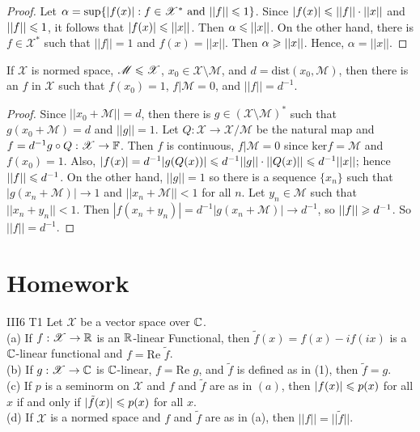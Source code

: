 \begin{proof}
    Let $\alpha = \sup \{|f(x)|:f\in\mathscr{X}^* \text{ and }||f||\leqslant 1\}$.
    Since $|f(x)|\leqslant ||f||\cdot ||x||$  and $||f||\leqslant 1$, it follows that $|f(x)|\leqslant ||x||$. Then $\alpha\leqslant ||x||$.
    On the other hand, there is $f\in \mathscr{X}^*$ such that $||f||=1$ and $f(x)=||x||$. Then $\alpha\geqslant ||x||$.
    Hence, $\alpha=||x||$.
\end{proof}

\begin{corollary}
    If $\mathscr{X}$ is normed space, $\mathscr{M}\leqslant \mathscr{X}$, $x_0\in \mathscr{X}\setminus \mathscr{M}$, and $d=\text{dist}(x_0,\mathscr{M})$,
    then there is an $f$ in $\mathscr{X}$ such that $f(x_0)=1$, $f|\mathscr{M}=0$, and $||f||=d^{-1}$.
\end{corollary}

\begin{proof}
    Since $||x_0+\mathscr{M}||=d$, then there is $g\in (\mathscr{X}\setminus \mathscr{M})^*$ such that $g(x_0+\mathscr{M})=d$ and $||g||=1$.
    Let $Q:\mathscr{X}\rightarrow \mathscr{X}/\mathscr{M}$ be the natural map and $f=d^{-1}g\circ Q:\mathscr{X}\rightarrow \mathbb{F}$.
    Then $f$ is continuous, $f|\mathscr{M}=0$ since $\text{ker}f=\mathscr{M}$ and $f(x_0)=1$.
    Also, $|f(x)|=d^{-1}|g(Q(x))|\leqslant d^{-1}||g||\cdot ||Q(x)||\leqslant d^{-1}||x||$;
    hence $||f||\leqslant d^{-1}$.
    On the other hand, $||g||=1$ so there is a sequence $\{x_n\}$ such that $|g(x_n+\mathscr{M})|\rightarrow 1$ and $||x_n+\mathscr{M}||<1$ for all $n$.
    Let $y_n\in\mathscr{M}$ such that $||x_n+y_n||<1$. 
    Then $|f(x_n+y_n)|=d^{-1}|g(x_n+\mathscr{M})|\rightarrow d^{-1}$, so $||f||\geqslant d^{-1}$.
    So $||f||=d^{-1}$.
\end{proof}



\section{Homework}

\begin{exercise}{III6 T1}{}
    Let $\mathscr{X}$ be a vector space over $\mathbb{C}$.\\
    (a) If $f:\mathscr{X}\rightarrow \mathbb{R}$ is an $\mathbb{R}$-linear Functional, then
    $\tilde{f}(x)=f(x)-if(ix)$ is a $\mathbb{C}$-linear functional and $f=\text{Re }\tilde{f}$.\\
    (b) If $g:\mathscr{X}\rightarrow \mathbb{C}$ is $\mathbb{C}$-linear, $f=\text{Re }g$, and $\tilde{f}$ is defined as in (1), then $\tilde{f}=g$.\\
    (c) If $p$ is a seminorm on $\mathscr{X}$ and $f$ and $\tilde{f}$ are as in $(a)$,
    then $|f(x)|\leqslant p(x)$ for all $x$ if and only if $|\tilde{f}(x)|\leqslant p(x)$ for all $x$.\\
    (d) If $\mathscr{X}$ is a normed space and $f$ and $\tilde{f}$ are as in (a), then $||f||=||\tilde{f}||$.
\end{exercise}

